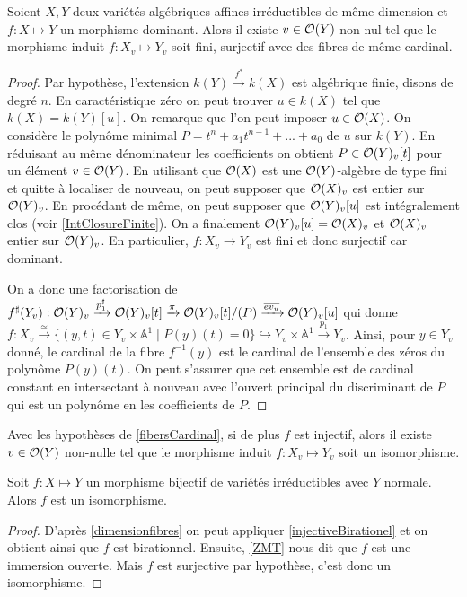 \begin{prop}\label{fibersCardinal}
Soient $X,Y$ deux variétés algébriques affines irréductibles de même dimension et $f:X \mapsto Y$ un morphisme dominant. Alors il existe $v\in \mathcal{O}(Y)$ non-nul tel que le morphisme induit $f:X_v \mapsto Y_v$ soit fini, surjectif avec des fibres de même cardinal.
\end{prop}
\begin{proof}
Par hypothèse, l'extension $k(Y) \xrightarrow{f^*} k(X)$ est algébrique finie, disons de degré $n$. En caractéristique zéro on peut trouver $u\in k(X)$ tel que $k(X)=k(Y)[u]$. On remarque que l'on peut imposer $u\in \mathcal{O}(X)$. On considère le polynôme minimal $P=t^n+a_1t^{n-1}+...+a_0$ de $u$ sur $k(Y)$. En réduisant au même dénominateur les coefficients on obtient $P\in \mathcal{O}(Y)_v[t]$ pour un élément $v\in \mathcal{O}(Y)$. En utilisant que $\mathcal{O}(X)$ est une $\mathcal{O}(Y)$-algèbre de type fini et quitte à localiser de nouveau, on peut supposer que $\mathcal{O}(X)_v$ est entier sur $\mathcal{O}(Y)_v$. En procédant de même, on peut supposer que $\mathcal{O}(Y)_v[u]$ est intégralement clos (voir \ref{IntClosureFinite}). On a finalement $\mathcal{O}(Y)_v[u]=\mathcal{O}(X)_v$ et $\mathcal{O}(X)_v$ entier sur $\mathcal{O}(Y)_v$. En particulier, $f:X_v \rightarrow Y_v$ est fini et donc surjectif car dominant.

On a donc une factorisation de $f^\sharp(Y_v):\mathcal{O}(Y)_v\xrightarrow{p_1^\sharp}\mathcal{O}(Y)_v[t]\xrightarrow{\pi}\mathcal{O}(Y)_v[t]/(P)\xrightarrow{\overline{ev_u}}\mathcal{O}(Y)_v[u]$ qui donne $f:X_v \xrightarrow{\simeq} \lbrace (y,t) \in Y_v\times \mathbb{A}^1\mid P(y)(t)=0\rbrace \hookrightarrow Y_v\times \mathbb{A}^1 \xrightarrow{p_1} Y_v$. Ainsi, pour $y\in Y_v$ donné, le cardinal de la fibre $f^{-1}(y)$ est le cardinal de l'ensemble des zéros du polynôme $P(y)(t)$. On peut s'assurer que cet ensemble est de cardinal constant en intersectant à nouveau avec l'ouvert principal du discriminant de $P$ qui est un polynôme en les coefficients de $P$.
\end{proof}

\begin{cor}\label{injectiveBirationel}
Avec les hypothèses de \ref{fibersCardinal}, si de plus $f$ est injectif, alors il existe $v\in \mathcal{O}(Y)$ non-nulle tel que le morphisme induit $f:X_v \mapsto Y_v$ soit un isomorphisme.
\end{cor}

\begin{thm}\label{ZMTCor}
Soit $f:X \mapsto Y$ un morphisme bijectif de variétés irréductibles avec $Y$ normale. Alors $f$ est un isomorphisme.
\end{thm}
\begin{proof}
D'après \ref{dimensionfibres} on peut appliquer \ref{injectiveBirationel} et on obtient ainsi que $f$ est birationnel. Ensuite, \ref{ZMT} nous dit que $f$ est une immersion ouverte. Mais $f$ est surjective par hypothèse, c'est donc un isomorphisme.
\end{proof}

